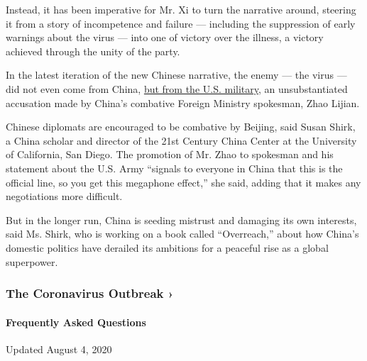 Instead, it has been imperative for Mr. Xi to turn the narrative around,
steering it from a story of incompetence and failure --- including the
suppression of early warnings about the virus --- into one of victory
over the illness, a victory achieved through the unity of the party.

In the latest iteration of the new Chinese narrative, the enemy --- the
virus --- did not even come from China,
\href{https://www.nytimes.com/2020/03/13/world/asia/coronavirus-china-conspiracy-theory.html}{but
from the U.S. military}, an unsubstantiated accusation made by China's
combative Foreign Ministry spokesman, Zhao Lijian.

Chinese diplomats are encouraged to be combative by Beijing, said Susan
Shirk, a China scholar and director of the 21st Century China Center at
the University of California, San Diego. The promotion of Mr. Zhao to
spokesman and his statement about the U.S. Army ``signals to everyone in
China that this is the official line, so you get this megaphone
effect,'' she said, adding that it makes any negotiations more
difficult.

But in the longer run, China is seeding mistrust and damaging its own
interests, said Ms. Shirk, who is working on a book called
``Overreach,'' about how China's domestic politics have derailed its
ambitions for a peaceful rise as a global superpower.

\href{https://www.nytimes.com/news-event/coronavirus?action=click\&pgtype=Article\&state=default\&region=MAIN_CONTENT_3\&context=storylines_faq}{}

\hypertarget{the-coronavirus-outbreak-}{%
\subsubsection{The Coronavirus Outbreak
›}\label{the-coronavirus-outbreak-}}

\hypertarget{frequently-asked-questions}{%
\paragraph{Frequently Asked
Questions}\label{frequently-asked-questions}}

Updated August 4, 2020

